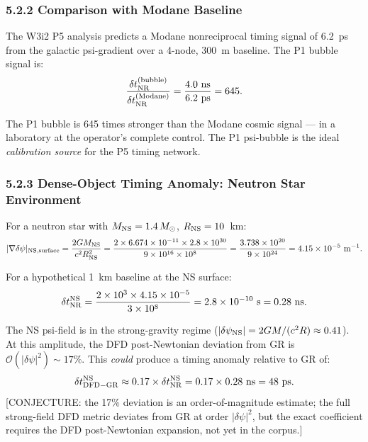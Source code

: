 \documentclass[11pt,twocolumn]{article}
\newcommand{\dpsi}{\delta\psi}
\newcommand{\order}[1]{\mathcal{O}(#1)}
\begin{document}
\subsubsection*{5.2.2 Comparison with Modane Baseline}

The W3i2 P5 analysis predicts a Modane nonreciprocal timing signal of
6.2~ps from the galactic psi-gradient over a 4-node, 300~m baseline. The
P1 bubble signal is:
\begin{equation}
\frac{\delta t_{\rm NR}^{(\rm bubble)}}{\delta t_{\rm NR}^{(\rm Modane)}}
= \frac{4.0~\text{ns}}{6.2~\text{ps}} = 645.
\end{equation}

The P1 bubble is 645 times stronger than the Modane cosmic signal --- in a
laboratory at the operator's complete control. The P1 psi-bubble is the
ideal \emph{calibration source} for the P5 timing network.

\subsubsection*{5.2.3 Dense-Object Timing Anomaly: Neutron Star Environment}

For a neutron star with $M_{\rm NS} = 1.4\,M_\odot$, $R_{\rm NS} = 10$~km:
\begin{equation}
|\nabla\dpsi|_{\rm NS,surface}
= \frac{2GM_{\rm NS}}{c^2 R_{\rm NS}^2}
= \frac{2\times6.674\times10^{-11}\times2.8\times10^{30}}
  {9\times10^{16}\times10^8}
= \frac{3.738\times10^{20}}{9\times10^{24}}
= 4.15\times10^{-5}~\text{m}^{-1}.
\label{eq:NS_gradient}
\end{equation}

For a hypothetical 1~km baseline at the NS surface:
\begin{equation}
\delta t_{\rm NR}^{\rm NS} = \frac{2\times10^3\times4.15\times10^{-5}}{3\times10^8}
= 2.8\times10^{-10}~\text{s} = 0.28~\text{ns}.
\label{eq:NS_NR}
\end{equation}

The NS psi-field is in the strong-gravity regime ($|\dpsi_{\rm NS}|
= 2GM/(c^2 R) \approx 0.41$). At this amplitude, the DFD
post-Newtonian deviation from GR is $\order{|\dpsi|^2} \sim 17\%$.
This \emph{could} produce a timing anomaly relative to GR of:
\begin{equation}
\delta t_{\rm DFD-GR}^{\rm NS} \approx 0.17\times\delta t_{\rm NR}^{\rm NS}
= 0.17\times0.28~\text{ns} = 48~\text{ps}.
\label{eq:NS_DFD_GR}
\end{equation}
\textcolor{conjecturecolor}{[CONJECTURE: the 17\% deviation is an
order-of-magnitude estimate; the full strong-field DFD metric
deviates from GR at order $|\dpsi|^2$, but the exact coefficient
requires the DFD post-Newtonian expansion, not yet in the corpus.]}
\end{document}
